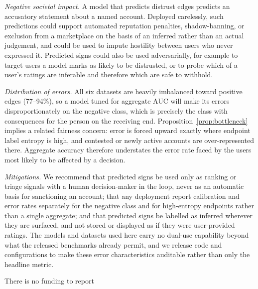 \documentclass[sigconf, review, anonymous]{acmart}
\theoremstyle{plain}
\theoremstyle{definition}
\begin{document}
\emph{Negative societal impact.} A model that predicts distrust edges predicts an accusatory statement about a named account. Deployed carelessly, such predictions could support automated reputation penalties, shadow-banning, or exclusion from a marketplace on the basis of an inferred rather than an actual judgement, and could be used to impute hostility between users who never expressed it. Predicted signs could also be used adversarially, for example to target users a model marks as likely to be distrusted, or to probe which of a user's ratings are inferable and therefore which are safe to withhold.

\emph{Distribution of errors.} All six datasets are heavily imbalanced toward positive edges (77--94\%), so a model tuned for aggregate AUC will make its errors disproportionately on the negative class, which is precisely the class with consequences for the person on the receiving end. Proposition~\ref{prop:bottleneck} implies a related fairness concern: error is forced upward exactly where endpoint label entropy is high, and contested or newly active accounts are over-represented there. Aggregate accuracy therefore understates the error rate faced by the users most likely to be affected by a decision.

\emph{Mitigations.} We recommend that predicted signs be used only as ranking or triage signals with a human decision-maker in the loop, never as an automatic basis for sanctioning an account; that any deployment report calibration and error rates separately for the negative class and for high-entropy endpoints rather than a single aggregate; and that predicted signs be labelled as inferred wherever they are surfaced, and not stored or displayed as if they were user-provided ratings. The models and datasets used here carry no dual-use capability beyond what the released benchmarks already permit, and we release code and configurations to make these error characteristics auditable rather than only the headline metric.

\begin{acks}
There is no funding to report
\end{acks}


\end{document}
